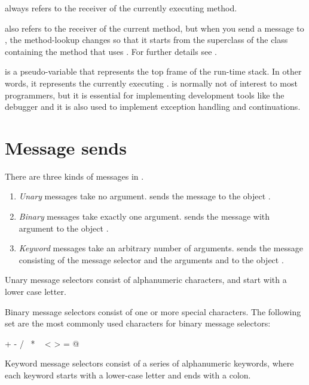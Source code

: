 \documentclass[a4paper,10pt,twoside]{book}
\begin{document}
 always refers to the receiver of the currently executing method.

 also refers to the receiver of the current method, but when you send a message to \super, the method-lookup changes so that it starts from the superclass of the class containing the method that uses .
For further details see .

 is a pseudo-variable that represents the top frame of the run-time stack.
In other words, it represents the currently executing .
 is normally not of interest to most programmers, but it is essential for implementing development tools like the debugger and it is also used to implement exception handling and continuations.

\section{Message sends}

There are three kinds of messages in \sq.
\begin{enumerate}
  \item \emph{Unary} messages take no argument.
   sends the message  to the object .
  \item \emph{Binary} messages take exactly one argument.
  	 sends the message \ct{+} with argument  to the object .
  \item \emph{Keyword} messages take an arbitrary number of arguments.
  	 sends the message consisting of the message selector
	 and the arguments  and  to the object .
\end{enumerate}

Unary message selectors consist of alphanumeric characters, and start with a lower case letter.

Binary message selectors consist of one or more special characters. The following set are the most commonly used characters for binary message selectors:
\begin{code}{}
+ - / \ * ~ < > = @ %
\end{code}
\noindent
Keyword message selectors consist of a series of alphanumeric keywords, where each keyword starts with a lower-case letter and ends with a colon.
\end{document}
